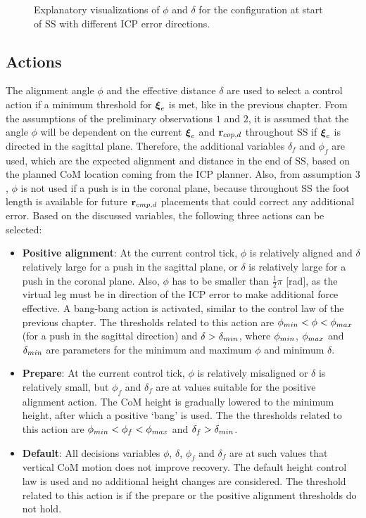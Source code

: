\begin{figure}[h]
\begin{subfigure}{0.49\textwidth}
    \caption{}
     \label{fig:phiVizf}
  \end{subfigure}
  \caption{Explanatory visualizations of $\phi$ and $\delta$ for the configuration at start of \ac{SS} with different \ac{ICP} error directions.}
  \label{fig:phiViz}
\end{figure}

\subsection{Actions}
The alignment angle $\phi$ and the effective distance $\delta$ are used to select a control action if a minimum threshold for $\boldsymbol{\xi}_e$ is met, like in the previous chapter. From the assumptions of the preliminary observations $1$ and $2$, it is assumed that the angle $\phi$ will be dependent on the current $\boldsymbol{\xi}_e$ and $\mathbf{r}_{cop,d}$ throughout \ac{SS} if $\boldsymbol{\xi}_e$ is directed in the sagittal plane. Therefore, the additional variables $\delta_f$ and $\phi_f$ are used, which are the expected alignment and distance in the end of \ac{SS}, based on the planned \ac{CoM} location coming from the \ac{ICP} planner. Also, from assumption $3$, $\phi$ is not used if a push is in the coronal plane, because throughout \ac{SS} the foot length is available for future $\mathbf{r}_{cmp,d}$ placements that could correct any additional error. Based on the discussed variables, the following three actions can be selected:
\begin{itemize}
	\item \textbf{Positive alignment}: At the current control tick, $\phi$ is relatively aligned and $\delta$ relatively large for a push in the sagittal plane, or $\delta$ is relatively large for a push in the coronal plane. Also, $\phi$ has to be smaller than $\frac{1}{2}\pi$ [rad], as the virtual leg must be in direction of the \ac{ICP} error to make additional force effective. A bang-bang action is activated, similar to the control law of the previous chapter. The thresholds related to this action are $\phi_{min} < \phi < \phi_{max}$ (for a push in the sagittal direction) and $\delta > \delta_{min}$, where $\phi_{min}$, $\phi_{max}$ and $\delta_{min}$ are parameters for the minimum and maximum $\phi$ and minimum $\delta$.
	\item \textbf{Prepare}: At the current control tick, $\phi$ is relatively misaligned or $\delta$ is relatively small, but $\phi_f$ and $\delta_f$ are at values suitable for the positive alignment action. The \ac{CoM} height is gradually lowered to the minimum height, after which a positive `bang' is used. The the thresholds related to this action are $\phi_{min}<\phi_f<\phi_{max}$ and $\delta_f>\delta_{min}$.
	\item \textbf{Default}: All decisions variables $\phi$, $\delta$, $\phi_f$ and $\delta_f$ are at such values that vertical \ac{CoM} motion does not improve recovery. The default height control law is used and no additional height changes are considered. The threshold related to this action is if the prepare or the positive alignment thresholds do not hold.
\end{itemize}

